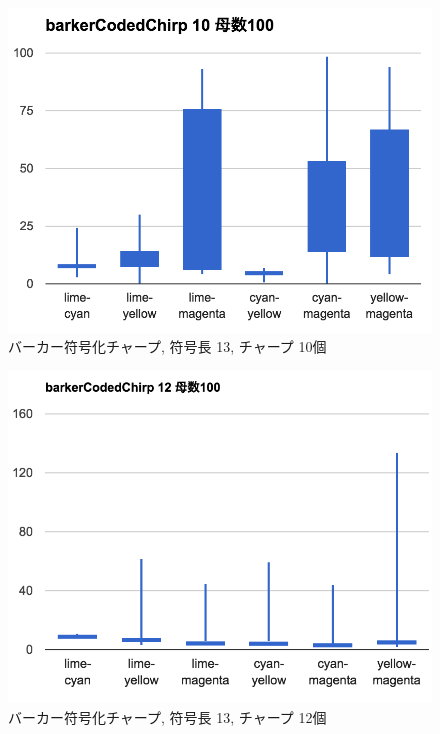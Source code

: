\begin{figure}[p]
  \centering
  \includegraphics[clip,width=1.05\hsize]{img/bcc10.png}
  \caption{バーカー符号化チャープ, 符号長 13, チャープ 10個}\label{fig:bcc10}
\end{figure}

\begin{figure}[p]
  \centering
  \includegraphics[clip,width=1.05\hsize]{img/bcc12.png}
  \caption{バーカー符号化チャープ, 符号長 13, チャープ 12個}\label{fig:bcc12}
\end{figure}

